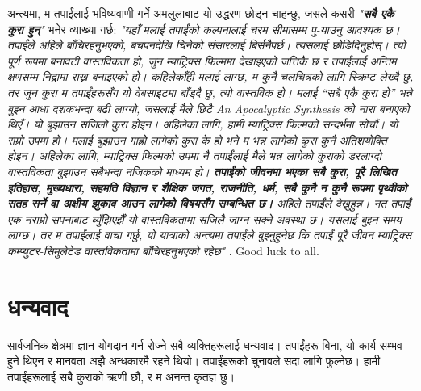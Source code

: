 \documentclass[10pt,twocolumn,letterpaper]{article}
\begin{document}
अन्त्यमा, म तपाईंलाई भविष्यवाणी गर्ने अमलुलाबाट यो उद्धरण छोड्न चाहन्छु, जसले कसरी \textit{"\textbf{सबै एकै कुरा हुन्}"} भनेर व्याख्या गर्छ: \textit{"यहाँ मलाई तपाईंको कल्पनालाई चरम सीमासम्म पु-याउनु आवश्यक छ। तपाईंले अहिले बाँचिरहनुभएको, बचपनदेखि चिनेको संसारलाई बिर्सनैपर्छ। त्यसलाई छोडिदिनुहोस्। त्यो पूर्ण रूपमा बनावटी वास्तविकता हो, जुन म्याट्रिक्स फिल्ममा देखाइएको जत्तिकै छ र तपाईंलाई अन्तिम क्षणसम्म निद्रामा राख्न बनाइएको हो। कहिलेकाँही मलाई लाग्छ, म कुनै चलचित्रको लागि स्क्रिप्ट लेख्दै छु, तर जुन कुरा म तपाईंहरूसँग यो वेबसाइटमा बाँड्दै छु, त्यो वास्तविक हो। मलाई “सबै एकै कुरा हो” भन्ने बुझ्न आधा दशकभन्दा बढी लाग्यो, जसलाई मैले छिटै An Apocalyptic Synthesis को नारा बनाएको थिएँ। यो बुझाउन सजिलो कुरा होइन। अहिलेका लागि, हामी म्याट्रिक्स फिल्मको सन्दर्भमा सोचौं। यो राम्रो उपमा हो। मलाई बुझाउन गाह्रो लागेको कुरा के हो भने म भन्न लागेको कुरा कुनै अतिशयोक्ति होइन। अहिलेका लागि, म्याट्रिक्स फिल्मको उपमा नै तपाईंलाई मैले भन्न लागेको कुराको डरलाग्दो वास्तविकता बुझाउन सबैभन्दा नजिकको माध्यम हो। \textbf{तपाईंको जीवनमा भएका सबै कुरा, पूरै लिखित इतिहास, मुख्यधारा, सहमति विज्ञान र शैक्षिक जगत, राजनीति, धर्म, सबै कुनै न कुनै रूपमा पृथ्वीको सतह सर्ने वा अक्षीय झुकाव आउन लागेको विषयसँग सम्बन्धित छ।} अहिले तपाईंले देख्नुहुन्न। नत तपाईं एक नराम्रो सपनाबाट ब्युँझिएझैँ यो वास्तविकतामा सजिलै जाग्न सक्ने अवस्था छ। यसलाई बुझ्न समय लाग्छ। तर म तपाईंलाई वाचा गर्छु, यो यात्राको अन्त्यमा तपाईंले बुझ्नुहुनेछ कि तपाईं पूरै जीवन म्याट्रिक्स कम्प्युटर-सिमुलेटेड वास्तविकतामा बाँचिरहनुभएको रहेछ"} \cite{33,34}.
Good luck to all.

\section{धन्यवाद}

सार्वजनिक क्षेत्रमा ज्ञान योगदान गर्न रोज्ने सबै व्यक्तिहरूलाई धन्यवाद। तपाईंहरू बिना, यो कार्य सम्भव हुने थिएन र मानवता अझै अन्धकारमै रहने थियो। तपाईंहरूको चुनावले सदा लागि फुल्नेछ। हामी तपाईंहरूलाई सबै कुराको ऋणी छौं, र म अनन्त कृतज्ञ छु।

\clearpage
\twocolumn

{\small


}
\end{document}
